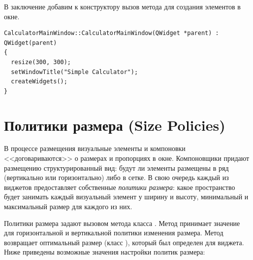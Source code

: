 В заключение добавим к конструктору вызов метода для создания элементов в окне.
\begin{lstlisting}
CalculatorMainWindow::CalculatorMainWindow(QWidget *parent) : QWidget(parent)
{
  resize(300, 300);
  setWindowTitle("Simple Calculator");
  createWidgets();
}
\end{lstlisting}

\section[Политики размера (Size Policies)]{Политики размера (Size Policies)}
В процессе размещения визуальные элементы и компоновки <<договариваются>> о размерах и пропорциях в окне. Компоновщики
придают размещению структурированный вид: будут ли элементы размещены в ряд (вертикально или горизонтально) либо в
сетке. В свою очередь каждый из виджетов предоставляет собственные \emph{политики размера}: какое пространство будет занимать каждый визуальный элемент у ширину и высоту,
минимальный и максимальный размер для каждого из них.

Политики размера задают вызовом метода  класса . Метод принимает значение для
горизонтальной и вертикальной политики изменения размера. Метод  возвращает оптимальный размер
(класс ), который был определен для виджета. Ниже приведены возможные значения
настройки политик размера:

